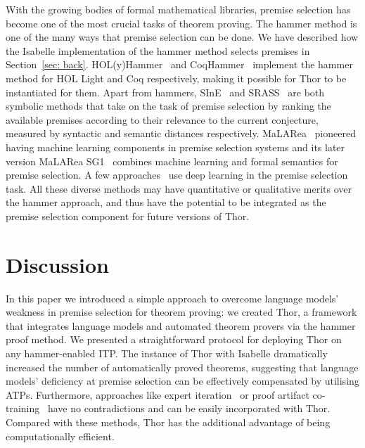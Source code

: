 \documentclass{article}
\begin{document}
With the growing bodies of formal mathematical libraries, premise selection has become one of the most crucial tasks of theorem proving.
The hammer method is one of the many ways that premise selection can be done.
We have described how the Isabelle implementation of the hammer method selects premises in Section~\ref{sec: back}.
HOL(y)Hammer~\citep{holyhammer} and CoqHammer~\citep{coqhammer} implement the hammer method for HOL Light and Coq respectively, making it possible for Thor to be instantiated for them.
Apart from hammers, SInE~\citep{hoder2011sine} and SRASS~\citep{sutcliffe2007srass} are both symbolic methods that take on the task of premise selection by ranking the available premises according to their relevance to the current conjecture, measured by syntactic and semantic distances respectively.
MaLARea~\citep{urban2007MaLAReaAM} pioneered having machine learning components in premise selection systems and its later version MaLARea SG1~\citep{urban2008sg1} combines machine learning and formal semantics for premise selection.
A few approaches~\citep{irving2016deepmath, wang2017premise, kaliszyk2017holstep} use deep learning in the premise selection task.
All these diverse methods may have quantitative or qualitative merits over the hammer approach, and thus have the potential to be integrated as the premise selection component for future versions of Thor.









 \section{Discussion}
\label{sec: discuss}


In this paper we introduced a simple approach to overcome language models' weakness in premise selection for theorem proving: we created Thor, a framework that integrates language models and automated theorem provers via the hammer proof method. We presented a straightforward protocol for deploying Thor on any hammer-enabled ITP. The instance of Thor with Isabelle dramatically increased the number of automatically proved theorems, suggesting that language models' deficiency at premise selection can be effectively compensated by utilising ATPs.
Furthermore, approaches like expert iteration~\citep{polu2022formal} or proof artifact co-training~\citep{han2021proof} have no contradictions and can be easily incorporated with Thor. Compared with these methods, Thor has the additional advantage of being computationally efficient.
\end{document}
